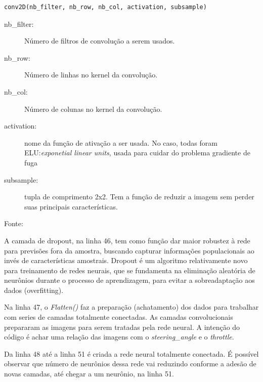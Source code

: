 \begin{lstlisting}
conv2D(nb_filter, nb_row, nb_col, activation, subsample)
\end{lstlisting}

\begin{description}
    \item[nb\_filter:] Número de filtros de convolução a serem usados.
    \item[nb\_row:] Número de linhas no kernel da convolução.
    \item[nb\_col:] Número de colunas no kernel da convolução.
    \item[activation:] nome da função de ativação a ser usada. No caso, todas foram ELU:\textit{exponetial linear units}, usada para cuidar do problema gradiente de fuga
    \item[subsample:] tupla de comprimento 2x2. Tem a função de reduzir a imagem sem perder suas principais características.
    \item[Fonte:] \cite{kerasconv}
\end{description}
A camada de dropout, na linha 46, tem como função dar maior robustez à rede para previsões fora da amostra, buscando capturar informações populacionais ao invés de características amostrais. 
Dropout é um algoritmo relativamente novo para treinamento de redes neurais, que se fundamenta na eliminação aleatória de neurônios durante o processo de aprendizagem, para evitar a sobreadaptação aos dados (overfitting).

Na linha 47, o \textit{Flatten()} faz a preparação (achatamento) dos dados para trabalhar com series de camadas totalmente conectadas. As camadas convolucionais prepararam as imagens para serem tratadas pela rede neural. A intenção do código é achar uma relação das imagens com o \textit{steering\_angle} e o \textit{throttle}.

Da linha 48 até a linha 51 é criada a rede neural totalmente conectada. É possível observar que número de neurônios dessa rede vai reduzindo conforme a adesão de novas camadas, até chegar a um neurônio, na linha 51. 


	\begin{figure}[H]
		\centering
\end{figure}


